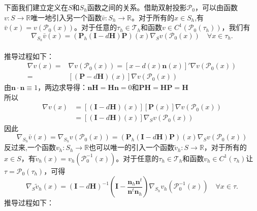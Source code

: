 下面我们建立定义在$S$和$S_h$函数之间的关系。借助双射投影$\mathcal{P}_0$，可以由函数$v:S\rightarrow\mathbb{R}$唯一地引入另一个函数$\bar{v}:S_h\rightarrow\mathbb{R}$。对于所有的$x\in S_h$,有$\bar{v}(x)=v(\mathcal{P}_0(x))$。对于任意的$\tau_h\in\mathcal{T}_h$和函数$v\in C^1(\mathcal{P}_0(\tau_h))$，我们有
\begin{equation}
\nabla_{S_h}\bar{v}(x)=(\boldsymbol{P}_h(\boldsymbol{I}-d\boldsymbol{H})\boldsymbol{P})(x)\nabla_{S}v(\mathcal{P}_0(x))\quad\forall x\in \tau_h.
\end{equation}\\
推导过程如下：
\begin{equation*}
\begin{aligned}
\nabla v(x)= &\nabla v(\mathcal{P}_0(x))=[x-d(x)\boldsymbol{n}(x)]'\nabla v(\mathcal{P}_0(x))\\
=&[(\boldsymbol{P}-d\boldsymbol{H})(x)]\nabla v(\mathcal{P}_0(x))
\end{aligned}
\end{equation*}
由$\boldsymbol{n}\cdot\boldsymbol{n}\equiv 1$，两边求导得：$\boldsymbol{n}\boldsymbol{H}=\boldsymbol{H}\boldsymbol{n}=0$和$\boldsymbol{P}\boldsymbol{H}=\boldsymbol{H}\boldsymbol{P}=\boldsymbol{H}$\\
所以
\begin{equation*}
\begin{aligned}
\nabla v(x)&=[(\boldsymbol{I}-d\boldsymbol{H})(x)][\boldsymbol{P}(x)]\nabla v(\mathcal{P}_0(x))\\
&=[(\boldsymbol{I}-d\boldsymbol{H})(x)]\nabla_S v(\mathcal{P}_0(x))
\end{aligned}
\end{equation*}
因此
\begin{equation*}
\nabla_{S_h}\bar{v}(x)=\nabla_{S_h}v(\mathcal{P}_0(x))=(\boldsymbol{P}_h(\boldsymbol{I}-d\boldsymbol{H})\boldsymbol{P})(x)\nabla_{S}v(\mathcal{P}_0(x))
\end{equation*}
反过来,一个函数$v_h:S_h\rightarrow\mathbb{R}$也可以唯一的引入一个函数$\tilde{v}_h:S\rightarrow\mathbb{R}$，对于所有的$x\in S$，有$\tilde{v}_h(x)=v_h(\mathcal{P}^{-1}_0(x))$。对于任意的$\tau_h\in\mathcal{T}_h$和函数$v_h\in C^1(\tau_h)$让$\tau=\mathcal{P}_0(\tau_h)$，可得
\begin{equation}
\nabla_{S}\tilde{v}_h(x)=(\boldsymbol{I}-d\boldsymbol{H})^{-1}\left(\boldsymbol{I}-\frac{\boldsymbol{n}_h\boldsymbol{n}^t}{\boldsymbol{n}^t\boldsymbol{n}_h}\right)\nabla_{S_h}v_h(\mathcal{P}^{-1}_0(x))\quad\forall x\in\tau.
\end{equation}
推导过程如下：\\
